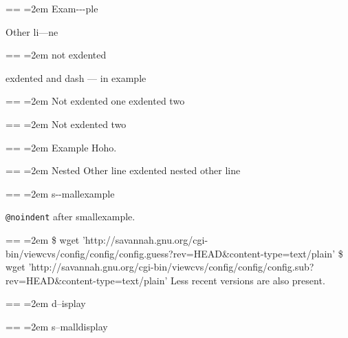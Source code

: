 \documentclass{book}
\makeatletter
\newenvironment{GNUTexinfopreformatted}{%
  \par\obeylines\obeyspaces\frenchspacing
  \parskip=\z@\parindent=\z@}{}
\makeatother
\begin{document}
\begin{GNUTexinfopreformatted}
\leftskip=2em\relax\ttfamily%
Exam{-}{-}{-}ple

\end{GNUTexinfopreformatted}
\noindent Other li---ne
\begin{GNUTexinfopreformatted}
\leftskip=2em\relax\ttfamily%
not exdented
\end{GNUTexinfopreformatted}

\noindent exdented  and dash --- in example
\begin{GNUTexinfopreformatted}
\leftskip=2em\relax\ttfamily%
Not exdented one
\end{GNUTexinfopreformatted}
\noindent exdented two
\begin{GNUTexinfopreformatted}
\leftskip=2em\relax\ttfamily%
Not exdented two
\end{GNUTexinfopreformatted}

\begin{GNUTexinfopreformatted}
\leftskip=2em\relax\ttfamily%
Example   Hoho.
\end{GNUTexinfopreformatted}
\begin{GNUTexinfopreformatted}
\leftskip=2em\relax\ttfamily%
Nested Other line
\end{GNUTexinfopreformatted}
\noindent exdented nested other line

\begin{GNUTexinfopreformatted}
\leftskip=2em\relax\ttfamily\footnotesize%
s{-}{-}mallexample
\end{GNUTexinfopreformatted}

\texttt{@noindent} after smallexample.
\begin{GNUTexinfopreformatted}
\leftskip=2em\relax\ttfamily\footnotesize%
\$ wget 'http://savannah.gnu.org/cgi-bin/viewcvs/config/config/config.guess?rev=HEAD\&content-type=text/plain'
\$ wget 'http://savannah.gnu.org/cgi-bin/viewcvs/config/config/config.sub?rev=HEAD\&content-type=text/plain'
\end{GNUTexinfopreformatted}
\noindent{}Less recent versions are also present.

\begin{GNUTexinfopreformatted}
\leftskip=2em\relax%
d--isplay
\end{GNUTexinfopreformatted}

\begin{GNUTexinfopreformatted}
\leftskip=2em\relax\footnotesize%
s--malldisplay
\end{GNUTexinfopreformatted}
\end{document}
